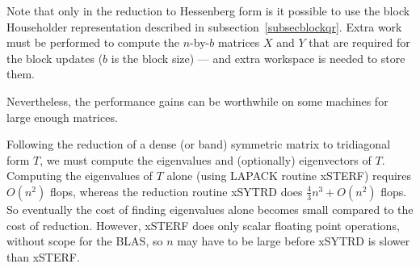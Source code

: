 Note that only in the reduction to Hessenberg form is it possible to
use the block Householder representation described in
subsection~\ref{subsecblockqr}.
Extra work must be performed to compute the $n$-by-$b$ matrices $X$ and $Y$
that are required for the block updates ($b$ is the block size)
--- and extra workspace is needed to
store them.

Nevertheless, the performance gains can be worthwhile on some machines
for large enough matrices.

Following the reduction of a dense (or band) symmetric matrix to tridiagonal
form $T$,
we must compute the eigenvalues and (optionally) eigenvectors of $T$.
Computing the eigenvalues of $T$ alone (using LAPACK routine
xSTERF) requires
$O(n^2)$ flops, whereas the reduction routine
xSYTRD does $\frac{4}{3}n^3 + O(n^2)$
flops. So eventually the cost of finding eigenvalues
alone becomes small compared to the cost of reduction. However, xSTERF
does only scalar floating point operations, without scope for the BLAS,
so $n$ may have to be large before xSYTRD is slower than xSTERF.

